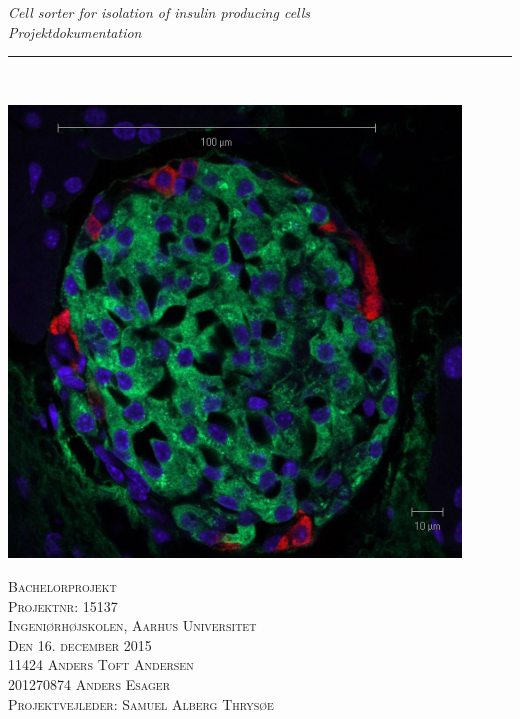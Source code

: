 \thispagestyle{empty}
\begin{center}
\vspace{3cm}

\phantom{hul}

\phantom{hul}

\phantom{hul}

\textsl{\LARGE Cell sorter for isolation of insulin producing cells} \\ \vspace{0.25cm}
\textsl{\Large Projektdokumentation} \\ %

\rule{13cm}{3mm} \\ \vspace{1cm}

\includegraphics[width=0.9\textwidth]{billeder/forside.jpg}

\textsc{\center Bachelorprojekt \\
Projektnr: 15137 \\
Ingeniørhøjskolen, Aarhus Universitet \\
Den 16. december 2015 \\ \vspace{1cm}
11424	Anders Toft Andersen \\
201270874	Anders Esager \\
Projektvejleder: Samuel Alberg Thrysøe \\}
\end{center}
